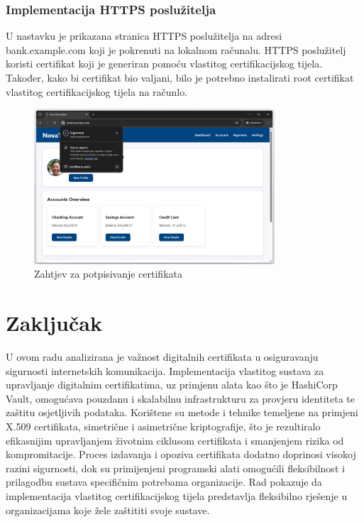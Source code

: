 \documentclass[]{foi}
\begin{document}
\subsection{Implementacija HTTPS poslužitelja}

U nastavku je prikazana stranica HTTPS poslužitelja
na adresi bank.example.com koji je pokrenuti na lokalnom
računalu.
HTTPS poslužitelj koristi certifikat koji je generiran
pomoću vlastitog certifikacijskog tijela. Također, kako bi certifikat
bio valjani, bilo je potrebno instalirati root certifikat vlastitog
certifikacijskog tijela na računlo.

\begin{figure}[H]
    \centering
    \includegraphics[width=0.8\textwidth]{assets/bank.png}
    \caption{Zahtjev za potpisivanje certifikata}
\end{figure}

\chapter{Zaključak}

U ovom radu analizirana je važnost digitalnih certifikata u osiguravanju sigurnosti internetskih komunikacija.
Implementacija vlastitog sustava za upravljanje digitalnim certifikatima, uz primjenu alata kao što je HashiCorp Vault,
omogućava pouzdanu i skalabilnu infrastrukturu za provjeru identiteta te zaštitu osjetljivih podataka.
Korištene su metode i tehnike temeljene na primjeni X.509 certifikata, simetrične i asimetrične kriptografije,
što je rezultiralo efikasnijim upravljanjem životnim ciklusom certifikata i smanjenjem rizika od kompromitacije.
Proces izdavanja i opoziva certifikata dodatno doprinosi visokoj razini sigurnosti, dok su primijenjeni programski
alati omogućili fleksibilnost i prilagodbu sustava specifičnim potrebama organizacije.
Rad pokazuje da implementacija vlastitog certifikacijskog tijela predstavlja fleksibilno
rješenje u organizacijama koje žele zaštititi svoje sustave.
\end{document}
